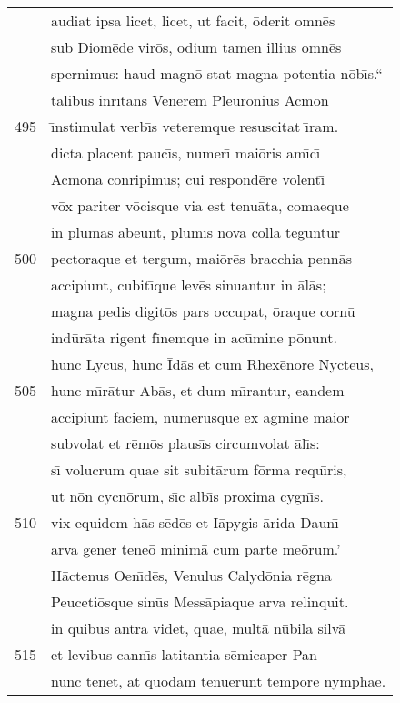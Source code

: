 \documentclass[paper=6in:9in,pagesize=pdftex,
               headinclude=on,footinclude=on,12pt]{scrbook}
\begin{document}
\begin{longtable}[p]{ r l }
 & audiat ipsa licet, licet, ut facit, \=oderit omn\=es\\ 
 & sub Diom\=ede vir\=os, odium tamen illius omn\=es\\ 
 & spernimus: haud magn\=o stat magna potentia n\=ob\={\i}s.``\\ 
 & t\=alibus inr\={\i}t\=ans Venerem Pleur\=onius Acm\=on\\ 
495 & \={\i}nstimulat verb\={\i}s veteremque resuscitat \={\i}ram.\\ 
 & dicta placent pauc\={\i}s, numer\={\i} mai\=oris am\={\i}c\={\i}\\ 
 & Acmona conripimus; cui respond\=ere volent\={\i}\\ 
 & v\=ox pariter v\=ocisque via est tenu\=ata, comaeque\\ 
 & in pl\=um\=as abeunt, pl\=um\={\i}s nova colla teguntur\\ 
500 & pectoraque et tergum, mai\=or\=es bracchia penn\=as\\ 
 & accipiunt, cubit\={\i}que lev\=es sinuantur in \=al\=as;\\ 
 & magna pedis digit\=os pars occupat, \=oraque corn\=u\\ 
 & ind\=ur\=ata rigent f\={\i}nemque in ac\=umine p\=onunt.\\ 
 & hunc Lycus, hunc \=Id\=as et cum Rhex\=enore Nycteus,\\ 
505 & hunc m\={\i}r\=atur Ab\=as, et dum m\={\i}rantur, eandem\\ 
 & accipiunt faciem, numerusque ex agmine maior\\ 
 & subvolat et r\=em\=os plaus\={\i}s circumvolat \=al\={\i}s:\\ 
 & s\={\i} volucrum quae sit subit\=arum f\=orma requ\={\i}ris,\\ 
 & ut n\=on cycn\=orum, s\={\i}c alb\={\i}s proxima cygn\={\i}s.\\ 
510 & vix equidem h\=as s\=ed\=es et I\=apygis \=arida Daun\={\i}\\ 
 & arva gener tene\=o minim\=a cum parte me\=orum.'\\ 
 & \indent H\=actenus Oen\={\i}d\=es, Venulus Calyd\=onia r\=egna\\ 
 & Peuceti\=osque sin\=us Mess\=apiaque arva relinquit.\\ 
 & in quibus antra videt, quae, mult\=a n\=ubila silv\=a\\ 
515 & et levibus cann\={\i}s latitantia s\=emicaper Pan\\ 
 & nunc tenet, at qu\=odam tenu\=erunt tempore nymphae.\\ 

\end{longtable}
\end{document}
